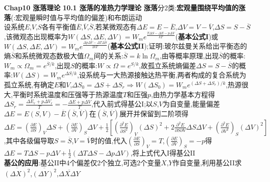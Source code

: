 \documentclass[10pt,a4paper]{article}
\begin{document}
\begin{multicols}{2}
\noindent\textbf{Chap10 涨落理论}
\textbf{10.1 涨落的准热力学理论}
\textbf{涨落}分$2$类:\textbf{宏观量围绕平均值的涨落}(:宏观量瞬时值与平均值的偏差)和布朗运动\\
设系统$E$,$V$,$S$各有平衡值$\overline{E}$,$\overline{V}$,$\overline{S}$,若某微观态有$\Delta E=E-\overline{E}$,$\Delta V=V-\overline{V}$,$\Delta S=S-\overline{S}$,该微观态出现概率为$W(\Delta S,\Delta E,\Delta V)=W_me^{\frac{T\Delta S-\Delta E-p\Delta V}{kT}}$(\textbf{基本公式I})或$W(\Delta S,\Delta E,\Delta V)=W_me^{\frac{\Delta p\Delta V-\Delta T\Delta S}{2kT}}$(\textbf{基本公式II});证明:玻尔兹曼关系给出平衡态的熵$\overline{S}$和系统微观态数极大值$\Omega_m$间的关系:$\overline{S}=k\ln\Omega_m$,由等概率原理,出现$\overline{S}$的概率:$W_m\propto\Omega_m=e^{\overline{S}/k}$,出现$S$的概率:$W\propto\Omega=e^{S/k}$,故孤立系统熵偏差$\Delta S=S-\overline{S}$的概率:$W(\Delta S)=W_me^{\Delta S/k}$,设系统与一大热源接触达热平衡,两者构成的复合系统为孤立系统,有确定$E$和$V$,$\Delta S_0=\Delta S+\Delta S_r\Rightarrow W(\Delta S_0)=W_me^{(\Delta S+\Delta S_r)/k}$,热源很大,平衡时系统温度和压强等于热源温度$T$和压强$p$,由热力学基本方程得$\Delta S_r=\frac{\Delta E_r+p\Delta V_r}{T}=-\frac{\Delta E+p\Delta V}{T}$,代入前式得基公I;以$S$,$V$为自变量,能量偏差$\Delta E=E(S,V)-\overline{E}(\overline{S},\overline{V})$在$(\overline{S},\overline{V})$展开并保留到二阶项得$\Delta E=\left(\frac{\partial E}{\partial S}\right)_V\Delta S+\left(\frac{\partial E}{\partial V}\right)_S\Delta V+\frac{1}{2}\left[\left(\frac{\partial^2E}{\partial S^2}\right)_V(\Delta S)^2+2\frac{\partial^2E}{\partial S\partial V}\Delta S\Delta V+\left(\frac{\partial^2E}{\partial V^2}\right)_S(\Delta V)^2\right]$,其中各级偏导取$S=\overline{S}$,$V=\overline{V}$时的值,代入$\left(\frac{\partial E}{\partial S}\right)_V=T$,$\left(\frac{\partial E}{\partial V}\right)_S=-p$得$\Delta E=T\Delta S-p\Delta V+\frac{1}{2}(\Delta T\Delta S-\Delta p\Delta V)$,将上式代入I得基公II\\
\textbf{基公的应用}:基公II中4个偏差仅2个独立,可选$2$个变量$X$,$Y$作自变量,利用基公II求$\overline{(\Delta X)^2}$,$\overline{(\Delta Y)^2}$,$\overline{\Delta X\Delta Y}$\\

\end{multicols}
\end{document}
